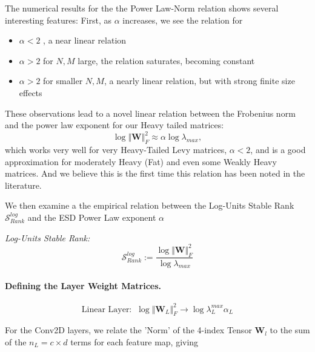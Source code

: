 The numerical results for the the Power Law-Norm relation shows several interesting features: 
First, as $\alpha$ increases, we see the relation for
\begin{itemize}
\item  $\alpha<2$ , a near linear relation 
\item  $\alpha>2$ for $N,M$ large, the relation saturates, becoming constant
\item   $\alpha>2$  for smaller $N,M$,  a nearly linear relation, but with strong finite size effects
\end{itemize}
These observations lead to a novel linear relation between the Frobenius norm and the power law exponent for our Heavy tailed matrices:
$$
\log\Vert\mathbf{W}\Vert^{2}_{F}\approx\alpha\log\lambda_{max}  ,
$$
which works very well for very Heavy-Tailed Levy matrices, $\alpha<2$, and is a good approximation for moderately Heavy (Fat) and even some Weakly Heavy matrices. 
And we believe this is the first time this relation has been noted in the literature.


We then examine a the empirical relation between  the Log-Units Stable Rank 
$\mathcal{S}^{log}_{Rank}$ and the ESD Power Law exponent $\alpha$

\emph{Log-Units Stable Rank:  } 
$$\mathcal{S}^{log}_{Rank}:=\dfrac{\log\Vert\mathbf{W}\Vert^{2}_{F}}{\log\lambda_{max}}$$



\paragraph{Defining the Layer Weight Matrices.} 


$$\text{Linear Layer:}\;\;\log\Vert\mathbf{W}_{L}\Vert^{2}_{F}\rightarrow\log\lambda^{max}_{L}\alpha_{L}$$

For the Conv2D layers, we relate the 'Norm' of the 4-index Tensor $\mathbf{W}_{l}$ to the sum of the $n_{L}=c\times d$ terms for each feature map, giving 

